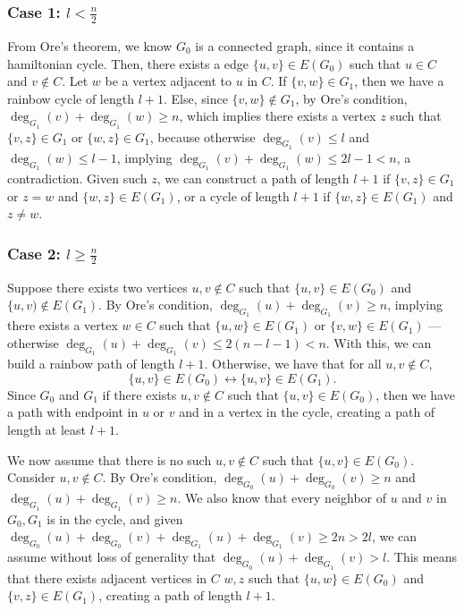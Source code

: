 \subsubsection{Case 1: \( l < \frac{n}{2} \)}

From Ore's theorem, we know \(G_0\) is a connected graph, since it contains a hamiltonian cycle. 
Then, there exists a edge \( \{u, v\} \in E(G_0) \) such that \( u \in C \) and \( v \not\in C \). 
Let \(w\) be a vertex adjacent to \(u\) in \(C\). 
If \(\{v, w\} \in G_1\), then we have a rainbow cycle of length \( l+1 \). 
Else, since \( \{v, w\} \not\in G_1 \), by Ore's condition, \( \deg_{G_1}(v) + \deg_{G_1}(w) \geq n \),
which implies there exists a vertex \( z \) such that \( \{v, z\} \in G_1 \) or \( \{w, z\} \in G_1 \), because otherwise
\( \deg_{G_1}(v) \leq l \) and \( \deg_{G_1}(w) \leq l - 1 \), implying 
\( \deg_{G_1}(v) + \deg_{G_1}(w) \leq 2l - 1 < n \), a contradiction.
Given such \(z\), we can construct a path of length \( l+1 \) if \( \{v, z\} \in G_1 \) or 
\( z = w \) and \( \{w, z\} \in E(G_1) \), or a cycle of length \( l+1 \) if \( \{w, z\} \in E(G_1) \) and \(z \neq w\).

\subsubsection{Case 2: \( l \geq \frac{n}{2} \)}

Suppose there exists two vertices \( u, v \not\in C \) such that \( \{u, v\} \in E(G_0) \) and \( \{u, v) \not\in E(G_1) \).
By Ore's condition, 
\( \deg_{G_1}(u) + \deg_{G_1}(v) \geq n \), 
implying there exists a vertex \( w \in C \) such that \( \{u, w\} \in E(G_1) \) or \( \{v, w\} \in E(G_1) \) 
--- otherwise \( \deg_{G_1}(u) + \deg_{G_1}(v) \leq 2 (n - l - 1) < n \).
With this, we can build a rainbow path of length \( l+1 \).
Otherwise, we have that for all \( u, v \not\in C \), 
\[ \{u, v\} \in E(G_0) \leftrightarrow \{u, v\} \in E(G_1). \]
Since \(G_0\) and \(G_1\) if there exists \(u, v \not\in C\) such that \( \{u, v\} \in E(G_0) \), 
then we have a path with endpoint in \(u\) or \(v\) and in a vertex in the cycle, creating a path of length at 
least \( l + 1 \).

We now assume that there is no such \(u, v \not \in C\) such that \( \{u, v\} \in E(G_0) \).
Consider \( u, v \not\in C \). By Ore's condition, 
\( \deg_{G_0}(u) + \deg_{G_0}(v) \geq n \) and \( \deg_{G_1}(u) + \deg_{G_1}(v) \geq n \). 
We also know that every neighbor of \(u\) and \(v\) in \(G_0, G_1\) is in the cycle, and
given \( \deg_{G_0}(u) + \deg_{G_0}(v) + \deg_{G_1}(u) + \deg_{G_1}(v) \geq 2n > 2l \), we 
can assume without loss of generality that \( \deg_{G_0}(u) + \deg_{G_1}(v) > l \).
This means that there exists adjacent vertices in \(C\) \(w, z\) such that
\( \{u, w\} \in E(G_0) \) and \( \{v, z\} \in E(G_1) \), creating a path of length \( l+1 \).